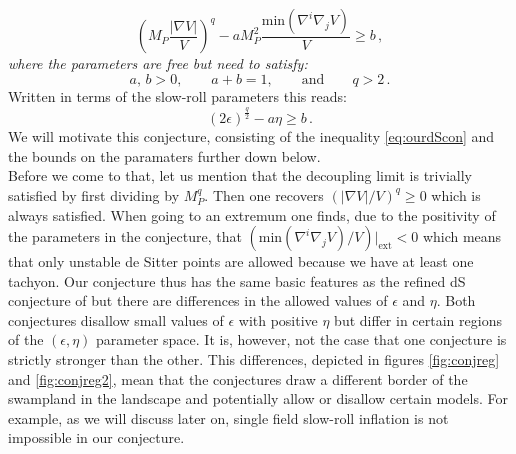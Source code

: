 \documentclass[a4paper,12pt,twoside,openright]{report}
\newcommand{\be}{\begin{equation}}
\newcommand{\ee}{\end{equation}}
\begin{document}
\be 
\left(M_P \frac{|\nabla V|}{V}\right)^ q - a M_P^2 \frac{\text{min}(\nabla^i \nabla_j V)}{V} \geq b\,,
\label{eq:ourdScon}
\ee
\emph{where the parameters are free but need to satisfy:}
\be 
a,\, b > 0,\qquad a+b = 1, \qquad \text{and}\qquad q>2\,.
\ee
Written in terms of the slow-roll parameters this reads:
\be 
(2\epsilon)^ {\frac{q}{2}} - a \eta \geq b\,.
\label{eq:ourdSconslowroll}
\ee
We will motivate this conjecture, consisting of the inequality \eqref{eq:ourdScon} and the bounds on the paramaters further down below.\\
Before we come to that, let us mention that the decoupling limit is trivially satisfied by first dividing by $M_P^q$. Then one recovers $(|\nabla V|/V)^q \geq 0$ which is always satisfied. When going to an extremum one finds, due to the positivity of the parameters in the conjecture, that $(\text{min}(\nabla^i \nabla_j V)/V)|_{\text{ext}}<0$ which means that only unstable de Sitter points are allowed because we have at least one tachyon. Our conjecture thus has the same basic features as the refined dS conjecture of \cite{Ooguri:2018wrx} but there are differences in the allowed values of $\epsilon$ and $\eta$. Both conjectures disallow small values of $\epsilon$ with positive $\eta$ but differ in certain regions of the $(\epsilon,\eta)$ parameter space. It is, however, not the case that one conjecture is strictly stronger than the other. This differences, depicted in figures \ref{fig:conjreg} and \ref{fig:conjreg2}, mean that the conjectures draw a different border of the swampland in the landscape and potentially allow or disallow certain models. For example, as we will discuss later on, single field slow-roll inflation is not impossible in our conjecture.
\end{document}
